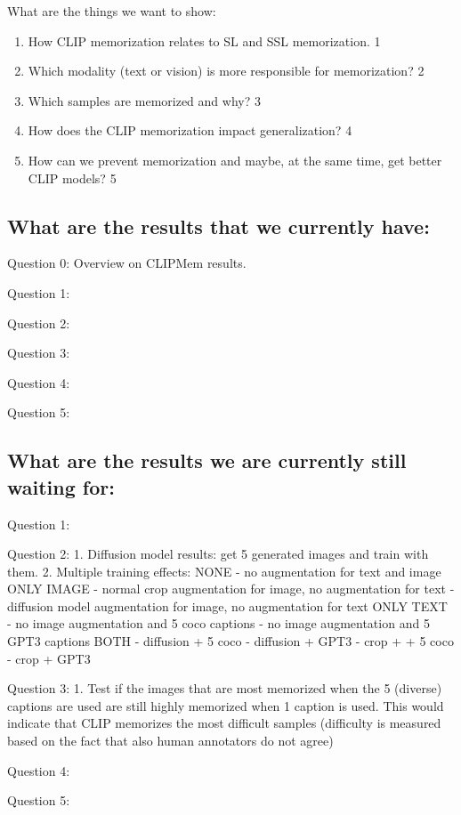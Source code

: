 What are the things we want to show:
\begin{enumerate}
    \item How CLIP memorization relates to SL and SSL memorization. 1
    \item Which modality (text or vision) is more responsible for memorization? 2
    \item Which samples are memorized and why? 3
    \item How does the CLIP memorization impact generalization? 4
    \item How can we prevent memorization and maybe, at the same time, get better CLIP models? 5
\end{enumerate}


\subsection{What are the results that we currently have:}

Question 0: Overview on CLIPMem results.

Question 1: 

Question 2: 


Question 3: 

Question 4: 

Question 5: 



\subsection{What are the results we are currently still waiting for:}

Question 1: 


Question 2: 
1. Diffusion model results: get 5 generated images and train with them.
2. Multiple training effects:
NONE
- no augmentation for text and image
ONLY IMAGE
- normal crop augmentation for image, no augmentation for text
- diffusion model augmentation for image, no augmentation for text
ONLY TEXT
- no image augmentation and 5 coco captions
- no image augmentation and 5 GPT3 captions
BOTH
- diffusion + 5 coco
- diffusion + GPT3
- crop + + 5 coco
- crop + GPT3


Question 3: 
1. Test if the images that are most memorized when the 5 (diverse) captions are used are still highly memorized when 1 caption is used. This would indicate that CLIP memorizes the most difficult samples (difficulty is measured based on the fact that also human annotators do not agree) 

Question 4: 

Question 5: 